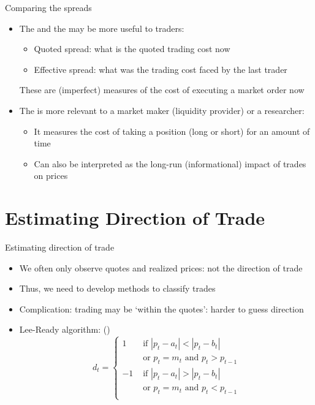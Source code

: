 \documentclass[english,10pt
,aspectratio=169
]{beamer}
\begin{document}
\begin{frame}{Comparing the spreads}
	\begin{itemize}
		\item The  and the  may be more useful to traders:
		\begin{itemize}
			\item Quoted spread: what is the quoted trading cost now 
			\item Effective spread: what was the trading cost faced by the last trader
		\end{itemize}
		These are (imperfect) measures of the cost of executing a market order now
		\item The  is more relevant to a market maker (liquidity provider) or a researcher:
		\begin{itemize}
			\item It measures the cost of taking a position (long or short) for an amount of time
			\item Can also be interpreted as the long-run (informational) impact of trades on prices
		\end{itemize}
	\end{itemize}
\end{frame}



\section{Estimating Direction of Trade}


\begin{frame}{Estimating direction of trade}
	\begin{itemize}
		\item We often only observe quotes and realized prices: not the direction of trade
		\item Thus, we need to develop methods to classify trades
		\item Complication: trading may be `within the quotes': harder to guess direction
		\item \alert{Lee-Ready algorithm}: (\citet{lee_inferring_1991})
		\[
		d_t = \left\{
		\begin{aligned}
		1 & \text{ if } |p_t-a_t| < |p_t-b_t| \\
		&\text{ or } p_t=m_t \text{ and } p_t>p_{t-1}\\
		-1 & \text{ if } |p_t-a_t| > |p_t-b_t| \\
		& \text{ or } p_t=m_t \text{ and } p_t<p_{t-1} \\
		\end{aligned}
		\right.
		\]
	\end{itemize}
\end{frame}
\end{document}
